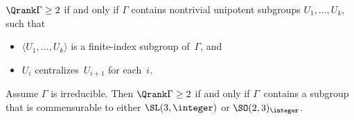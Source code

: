 \begin{prop} \label{Qrank2<>UnipGens}
$\Qrank \Gamma \ge 2$ if and only if\/ $\Gamma$ contains nontrivial unipotent subgroups $U_1,\ldots,U_k$, such that 
	\begin{itemize}
	\item $\langle U_1,\ldots,U_k \rangle$ is a finite-index subgroup of\/~$\Gamma$,
	and
	\item $U_i$ centralizes~$U_{i+1}$ for each~$i$.
	\end{itemize}
\end{prop}


\begin{prop} \label{Qrank2<>SL3orSO23}
Assume\/ $\Gamma$ is irreducible. Then $\Qrank \Gamma \ge 2$ if and only if\/ $\Gamma$~contains a subgroup that is commensurable to either\/ $\SL(3,\integer)$ or\/ $\SO(2,3)_\integer$.
\end{prop}



